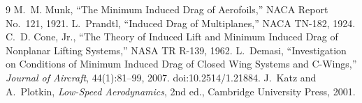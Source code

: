 \documentclass[11pt]{article}
\begin{document}
\begin{thebibliography}{9}
\itemsep0pt
 M.~M. Munk, ``The Minimum Induced Drag of Aerofoils,''
NACA Report No.~121, 1921.
 L.~Prandtl, ``Induced Drag of Multiplanes,''
NACA TN-182, 1924.
 C.~D. Cone, Jr., ``The Theory of Induced Lift and
Minimum Induced Drag of Nonplanar Lifting Systems,'' NASA TR R-139, 1962.
 L.~Demasi, ``Investigation on Conditions of Minimum
Induced Drag of Closed Wing Systems and C-Wings,'' \emph{Journal of
Aircraft}, 44(1):81--99, 2007. doi:10.2514/1.21884.
 J.~Katz and A.~Plotkin, \emph{Low-Speed Aerodynamics},
2nd ed., Cambridge University Press, 2001.
\end{thebibliography}
\end{document}
